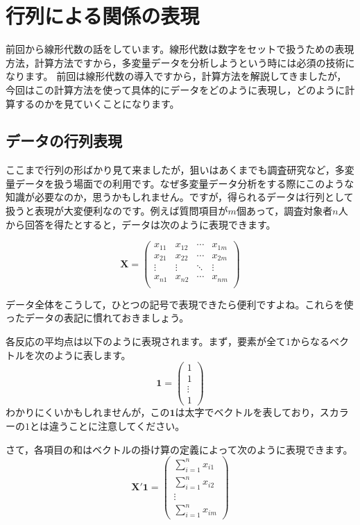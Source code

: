 \documentclass{ltjsbook}
\begin{document}
 
\chapter{行列による関係の表現} 
\label{chapter7} 
前回から線形代数の話をしています。線形代数は数字をセットで扱うための表現方法，計算方法ですから，多変量データを分析しようという時には必須の技術になります。
前回は線形代数の導入ですから，計算方法を解説してきましたが，今回はこの計算方法を使って具体的にデータをどのように表現し，どのように計算するのかを見ていくことになります。

\section{データの行列表現}

ここまで行列の形ばかり見て来ましたが，狙いはあくまでも調査研究など，多変量データを扱う場面での利用です。なぜ多変量データ分析をする際にこのような知識が必要なのか，思うかもしれません。ですが，得られるデータは行列として扱うと表現が大変便利なのです。例えば質問項目が$m$個あって，調査対象者$n$人から回答を得たとすると，データは次のように表現できます。

\[
\bm{X}=
\begin{pmatrix}
x_{11} & x_{12} & \cdots & x_{1m} \\
x_{21} & x_{22} & \cdots & x_{2m} \\
\vdots & \vdots & \ddots & \vdots \\
x_{n1} & x_{n2} & \cdots & x_{nm} \\
\end{pmatrix}
\]

データ全体をこうして，ひとつの記号で表現できたら便利ですよね。これらを使ったデータの表記に慣れておきましょう。

各反応の平均点は以下のように表現されます。まず，要素が全て$1$からなるベクトルを次のように表します。
\[ \bm{1}=\begin{pmatrix} 1 \\ 1 \\ \vdots \\1 \end{pmatrix} \]
わかりにくいかもしれませんが，この$\bm{1}$は太字でベクトルを表しており，スカラーの$1$とは違うことに注意してください。

さて，各項目の和はベクトルの掛け算の定義によって次のように表現できます。
\[ \bm{X}' \bm{1} = \begin{pmatrix} \sum_{i=1}^{n} x_{i1} \\ \sum_{i=1}^{n} x_{i2} \\ \vdots \\ \sum_{i=1}^{n} x_{im} \end{pmatrix} \]
\end{document}
